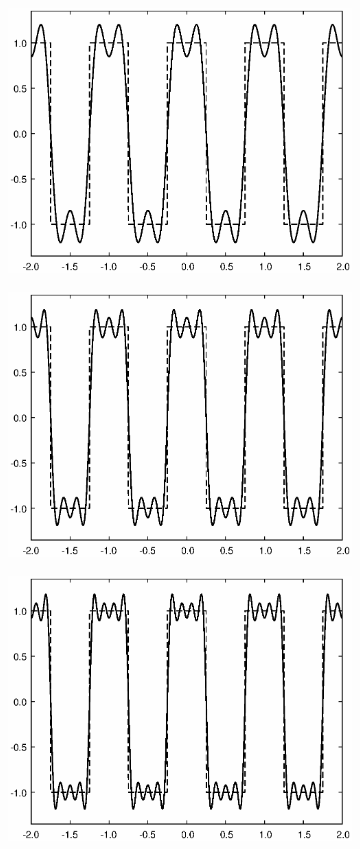 \documentclass[11pt,a4paper]{article}
\begin{document}
\begin{figure}[htbp]
\begin{subfigure}{0.48\textwidth}
\includegraphics[scale=0.5]{approx2_003}
\end{subfigure}
\begin{subfigure}{0.48\textwidth}
\includegraphics[scale=0.5]{approx2_005}
\end{subfigure}
\begin{subfigure}{0.48\textwidth}
\includegraphics[scale=0.5]{approx2_007}

\end{subfigure}
\end{figure}
\end{document}
